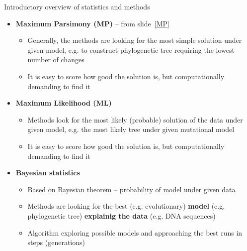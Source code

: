 \documentclass[compress, ucs, xelatex, 11pt, xcolor=svgnames,
  hyperref={
    bookmarks=true,
    unicode=true,
    colorlinks=true,
    pdftitle={Molecular data in R},
    plainpages=false,
    pdfauthor={Vojtech Zeisek},
    pdfsubject={Course about phylogeny and evolution in R},
    pdfcreator={XeLaTeX},
    pdfkeywords={R, evolution, phylogeny, molecular data},
    linkcolor=Tomato,
    anchorcolor=SaddleBrown,
    citecolor=Goldenrod,
    filecolor=DarkMagenta,
    menucolor=Sienna,
    urlcolor=DarkTurquoise,
    pdftex},
  url={hyphens, lowtilde} %
  ]{beamer}
\begin{document}
\begin{frame}[allowframebreaks]{Introductory overview of statistics and methods}
\begin{itemize}
\begin{itemize}
      \item Methods like Principal Component Analysis (\textbf{PCA}), Non-Metric Multidimensional Scaling (\textbf{NMDS}) or \textbf{PCoA} look for correlations between pairs of variables to reduce them into new variables -- after many steps new uncorrelated variables retaining maximum of original variability are constructed
      \item New variables are sorted according amount of variability they show (the decrease is very steep -- first 1-4~axes are usually enough) -- it is possible to display xy-scatter plot showing most of variability of the data
      \item Good for data display and creation of hypotheses -- not to verify them (there is no statistical test)
      \item Data are commonly scaled -- all variables are in same scale
    \end{itemize}
    \item \textbf{Maximum Parsimony (MP)} -- from slide~\ref{MP}
    \begin{itemize}
      \item Generally, the methods are looking for the most simple solution under given model, e.g. to construct phylogenetic tree requiring the lowest number of changes
      \item It is easy to score how good the solution is, but computationally demanding to find it
    \end{itemize}
    \item \textbf{Maximum Likelihood (ML)}
    \begin{itemize}
      \item Methods look for the most likely (probable) solution of the data under given model, e.g. the most likely tree under given mutational model
      \item It is easy to score how good the solution is, but computationally demanding to find it
    \end{itemize}
    \item \textbf{Bayesian statistics}
    \begin{itemize}
      \item Based on Bayesian theorem -- probability of model under given data
      \item Methods are looking for the best (e.g. evolutionary) \textbf{model} (e.g. phylogenetic tree) \textbf{explainig the data} (e.g. DNA sequences)
      \item Algorithm exploring possible models and approaching the best runs in steps (generations)

\end{itemize}
\end{itemize}
\end{frame}
\end{document}
